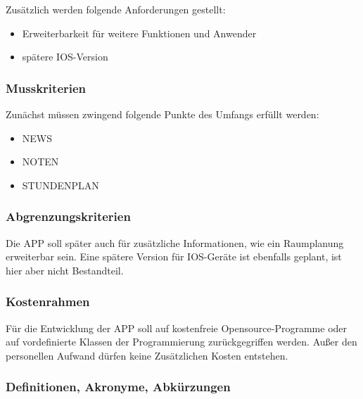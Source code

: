 Zusätzlich werden folgende Anforderungen gestellt:

\begin{itemize}
	\item Erweiterbarkeit für weitere Funktionen und Anwender
	\item spätere IOS-Version
\end{itemize}


\subsubsection{\textbf{Musskriterien}}

Zunächst müssen zwingend folgende Punkte des Umfangs erfüllt werden:

\begin{itemize}
   	\item NEWS
   	\item NOTEN
   	\item STUNDENPLAN   
\end{itemize}

\subsubsection{\textbf{Abgrenzungskriterien}}

Die \acs{APP} soll später auch für zusätzliche Informationen, wie ein Raumplanung erweiterbar sein. Eine spätere Version für IOS-Geräte ist ebenfalls geplant, ist hier aber nicht Bestandteil.				

\subsubsection{\textbf{Kostenrahmen}}

Für die Entwicklung der \acs{APP} soll auf kostenfreie Opensource-Programme oder auf vordefinierte Klassen der Programmierung zurückgegriffen werden.
Außer den personellen Aufwand dürfen keine Zusätzlichen Kosten entstehen.


\subsubsection{\textbf{Definitionen, Akronyme, Abkürzungen}}
\begin{acronym}[UV-Licht]

\end{acronym}


